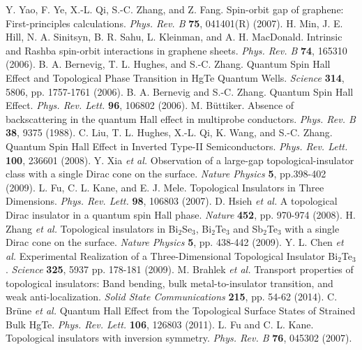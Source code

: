 \documentclass[titlepage,a4paper]{book}
\begin{document}
\begin{thebibliography}{199}
Y. Yao, F. Ye, X.-L. Qi, S.-C. Zhang, and Z. Fang. Spin-orbit gap of graphene: First-principles calculations. \textit{Phys. Rev. B} \textbf{75}, 041401(R) (2007).
H. Min, J. E. Hill, N. A. Sinitsyn, B. R. Sahu, L. Kleinman, and A. H. MacDonald. Intrinsic and Rashba spin-orbit interactions in graphene sheets. \textit{Phys. Rev. B} \textbf{74}, 165310 (2006).
B. A. Bernevig, T. L. Hughes, and S.-C. Zhang. Quantum Spin Hall Effect and Topological Phase Transition in HgTe Quantum Wells. \textit{Science} \textbf{314}, 5806, pp. 1757-1761 (2006).
B. A. Bernevig and S.-C. Zhang. Quantum Spin Hall Effect. \textit{Phys. Rev. Lett.} \textbf{96}, 106802 (2006).
M. Büttiker. Absence of backscattering in the quantum Hall effect in multiprobe conductors. \textit{Phys. Rev. B} \textbf{38}, 9375 (1988).
C. Liu, T. L. Hughes, X.-L. Qi, K. Wang, and S.-C. Zhang. Quantum Spin Hall Effect in Inverted Type-II Semiconductors. \textit{Phys. Rev. Lett.} \textbf{100}, 236601 (2008).
Y. Xia \textit{et al.} Observation of a large-gap topological-insulator class with a single Dirac cone on the surface. \textit{Nature Physics} \textbf{5}, pp.398-402 (2009).
L. Fu, C. L. Kane, and E. J. Mele. Topological Insulators in Three Dimensions. \textit{Phys. Rev. Lett.} \textbf{98}, 106803 (2007).
D. Hsieh \textit{et al.} A topological Dirac insulator in a quantum spin Hall phase. \textit{Nature} \textbf{452}, pp. 970-974 (2008).
H. Zhang \textit{et al.} Topological insulators in Bi$_2$Se$_3$, Bi$_2$Te$_3$ and Sb$_2$Te$_3$ with a single Dirac cone on the surface. \textit{Nature Physics} \textbf{5}, pp. 438-442 (2009).
Y. L. Chen \textit{et al.} Experimental Realization of a Three-Dimensional Topological Insulator Bi$_2$Te$_3$. \textit{Science} \textbf{325}, 5937 pp. 178-181 (2009).
M. Brahlek \textit{et al.} Transport properties of topological insulators: Band bending, bulk metal-to-insulator transition, and weak anti-localization. \textit{Solid State Communications} \textbf{215}, pp. 54-62 (2014).
C. Brüne \textit{et al.} Quantum Hall Effect from the Topological Surface States of Strained Bulk HgTe. \textit{Phys. Rev. Lett.} \textbf{106}, 126803 (2011).
L. Fu and C. L. Kane. Topological insulators with inversion symmetry. \textit{Phys. Rev. B} \textbf{76}, 045302 (2007).

\end{thebibliography}
\end{document}

